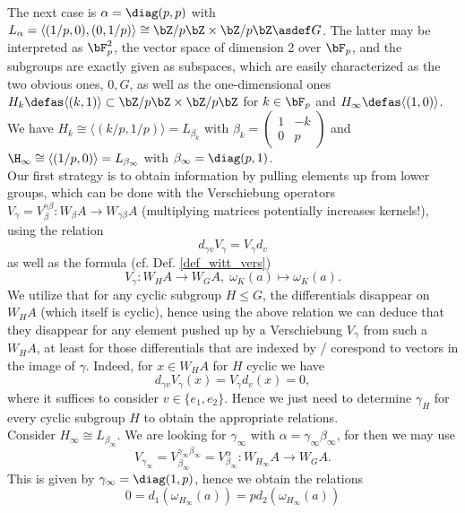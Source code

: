 The next case is $\alpha = \diag(p,p)$ with $L_\alpha = \langle (1/p,0), (0,1/p) \rangle \cong \bZ/p\bZ \times \bZ/p\bZ \asdef G$. The latter may be interpreted as $\bF_p^2$, the vector space of dimension 2 over $\bF_p$, and the subgroups are exactly given as subspaces, which are easily characterized as the two obvious ones, $0, G$, as well as the one-dimensional ones $H_k \defas \langle (k,1) \rangle \subset \bZ/p\bZ \times \bZ/p\bZ$ for $k \in \bF_p$ and $H_\infty \defas \langle (1,0) \rangle$. We have $H_k \cong \langle (k/p,1/p) \rangle = L_{\beta_k}$ with %
$\beta_k = \left( \begin{smallmatrix} 1 & -k \\ 0 & p \end{smallmatrix} \right)$ and $\H_\infty \cong \langle (1/p,0) \rangle = L_{\beta_\infty}$ with $\beta_\infty = \diag(p,1)$.\\
Our first strategy is to obtain information by pulling elements up from lower groups, which can be done with the Verschiebung operators $V_\gamma = V_{\beta}^{\gamma\beta}: W_\beta A \to W_{\gamma\beta} A$ (multiplying matrices potentially increases kernels!), using the relation%
\[d_{\gamma v} V_\gamma = V_\gamma d_v\]%
as well as the formula (cf. Def. \ref{def_witt_vers})
\[ V_\gamma: W_H A \to W_G A, \; \omega_K (a) \mapsto \omega_K (a). \]
We utilize that for any cyclic subgroup $H \leq G$, the differentials disappear on $W_H A$ (which itself is cyclic), hence using the above relation we can deduce that they disappear for any element pushed up by a Verschiebung $V_\gamma$ from such a $W_H A$, at least for those differentials that are indexed by / corespond to vectors in the image of $\gamma$. Indeed, for $x \in W_H A$ for $H$ cyclic we have
\begin{equation*}
	d_{\gamma v} V_\gamma (x) = V_\gamma d_v (x) = 0,
\end{equation*}
where it suffices to consider $v \in \{e_1,e_2\}$. Hence we just need to determine $\gamma_H$ for every cyclic subgroup $H$ to obtain the appropriate relations.\\
Consider $H_\infty \cong L_{\beta_\infty}$. We are looking for $\gamma_\infty$ with $\alpha = \gamma_\infty\beta_\infty$, for then we may use
\begin{equation*}
	V_{\gamma_\infty} = V_{\beta_\infty}^{\gamma_\infty\beta_\infty} = %
	V_{\beta_\infty}^{\alpha}: W_{H_\infty} A \to W_G A.
\end{equation*}
This is given by $\gamma_\infty = \diag(1,p)$, hence we obtain the relations
\begin{equation}\label{eq_group_diag(p,p)_subgroup_diag(1,p)}
	0 = d_1(\omega_{H_\infty}(a)) = p d_2 (\omega_{H_\infty}(a))
\end{equation}
